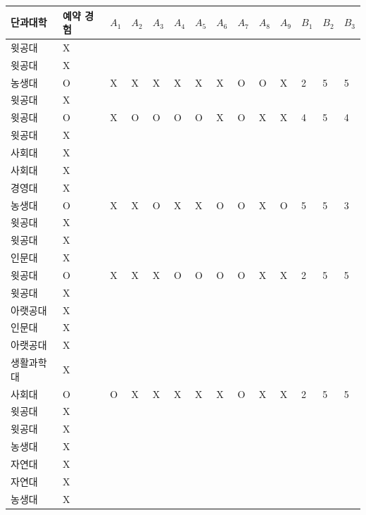 \documentclass[11pt,a4paper]{article}
\begin{document}
\begin{center}
\begin{supertabular}{ | p{2cm} | x{1.6cm} | x{0.5cm} | x{0.5cm} | x{0.5cm} | x{0.5cm} | x{0.5cm} | x{0.5cm} | x{0.5cm} | x{0.5cm} | x{0.5cm} | x{0.5cm} | x{0.5cm} | x{0.5cm} | }
\hline
단과대학 & 예약 경험 & $A_1$ & $A_2$ & $A_3$ & $A_4$ & $A_5$ & $A_6$ & $A_7$ & $A_8$ & $A_9$ & $B_1$ & $B_2$ & $B_3$ \\
\hline
윗공대 & X & & & & & & & & & & & & \\
윗공대 & X & & & & & & & & & & & & \\
농생대 & O & X & X & X & X & X & X & O & O & X & 2 & 5 & 5 \\
윗공대 & X & & & & & & & & & & & & \\
윗공대 & O & X & O & O & O & O & X & O & X & X & 4 & 5 & 4 \\
윗공대 & X & & & & & & & & & & & & \\
사회대 & X & & & & & & & & & & & & \\
사회대 & X & & & & & & & & & & & & \\
경영대 & X & & & & & & & & & & & & \\
농생대 & O & X & X & O & X & X & O & O & X & O & 5 & 5 & 3 \\
윗공대 & X & & & & & & & & & & & & \\
윗공대 & X & & & & & & & & & & & & \\
인문대 & X & & & & & & & & & & & & \\
윗공대 & O & X & X & X & O & O & O & O & X & X & 2 & 5 & 5 \\
윗공대 & X & & & & & & & & & & & & \\
아랫공대 & X & & & & & & & & & & & & \\
인문대 & X & & & & & & & & & & & & \\
아랫공대 & X & & & & & & & & & & & & \\
생활과학대 & X & & & & & & & & & & & & \\
사회대 & O & O & X & X & X & X & X & O & X & X & 2 & 5 & 5 \\
윗공대 & X & & & & & & & & & & & & \\
윗공대 & X & & & & & & & & & & & & \\
농생대 & X & & & & & & & & & & & & \\
자연대 & X & & & & & & & & & & & & \\
자연대 & X & & & & & & & & & & & & \\
농생대 & X & & & & & & & & & & & & \\

\end{supertabular}
\end{center}
\end{document}
